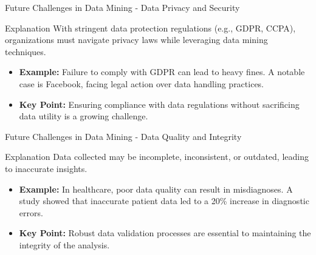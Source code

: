 \documentclass[aspectratio=169]{beamer}
\begin{document}
\begin{frame}[fragile]{Future Challenges in Data Mining - Data Privacy and Security}
    \begin{block}{Explanation}
        With stringent data protection regulations (e.g., GDPR, CCPA), organizations must navigate privacy laws while leveraging data mining techniques.
    \end{block}
    \begin{itemize}
        \item \textbf{Example:} Failure to comply with GDPR can lead to heavy fines. A notable case is Facebook, facing legal action over data handling practices.
        \item \textbf{Key Point:} Ensuring compliance with data regulations without sacrificing data utility is a growing challenge.
    \end{itemize}
\end{frame}

\begin{frame}[fragile]{Future Challenges in Data Mining - Data Quality and Integrity}
    \begin{block}{Explanation}
        Data collected may be incomplete, inconsistent, or outdated, leading to inaccurate insights.
    \end{block}
    \begin{itemize}
        \item \textbf{Example:} In healthcare, poor data quality can result in misdiagnoses. A study showed that inaccurate patient data led to a 20\% increase in diagnostic errors.
        \item \textbf{Key Point:} Robust data validation processes are essential to maintaining the integrity of the analysis.
    \end{itemize}
\end{frame}
\end{document}
